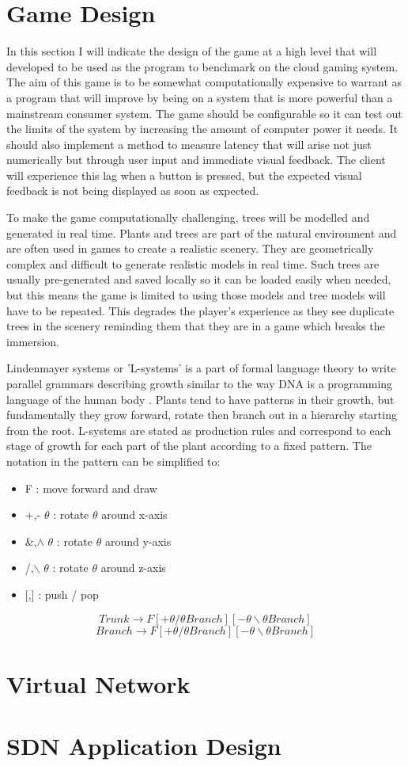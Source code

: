 \section{Game Design}
In this section I will indicate the design of the game at a high level that will developed to be used as the program to benchmark on the cloud gaming system. The aim of this game is to be somewhat computationally expensive to warrant as a program that will improve by being on a system that is more powerful than a mainstream consumer system. The game should be configurable so it can test out the limits of the system by increasing the amount of computer power it needs. It should also implement a method to measure latency that will arise not just numerically but through user input and immediate visual feedback. The client will experience this lag when a button is pressed, but the expected visual feedback is not being displayed as soon as expected.
\newline
\par
To make the game computationally challenging, trees will be modelled and generated in real time. Plants and trees are part of the natural environment and are often used in games to create a realistic scenery. They are geometrically complex and difficult to generate realistic models in real time. Such trees are usually pre-generated and saved locally so it can be loaded easily when needed, but this means the game is limited to using those models and tree models will have to be repeated. This degrades the player's experience as they see duplicate trees in the scenery reminding them that they are in a game which breaks the immersion.
\newline
\par
Lindenmayer systems or 'L-systems' is a part of formal language theory to write parallel grammars describing growth similar to the way DNA is a programming language of the human body \cite{prusinkiewicz2012algorithmic}. Plants tend to have patterns in their growth, but fundamentally they grow forward, rotate then branch out in a hierarchy starting from the root. L-systems are stated as production rules and correspond to each stage of growth for each part of the plant according to a fixed pattern. The notation in the pattern can be simplified to:
\begin{itemize}
 \item F 	:	move forward and draw
 \item +,- \(\theta\)	:	rotate \(\theta\) around x-axis
 \item \&,\(\wedge\) \(\theta\)	:	rotate \(\theta\) around y-axis
 \item /,\(\backslash\) \(\theta\)	:	rotate \(\theta\) around z-axis
 \item {[,]}	:	push / pop
\end{itemize}

\[Trunk \rightarrow F[+\theta /\theta Branch][-\theta \backslash\theta Branch]\]
\[Branch \rightarrow F[+\theta /\theta Branch][-\theta \backslash\theta Branch]\]

\section{Virtual Network}
\lipsum[1-1]

\section{SDN Application Design}
\lipsum[1-1]
